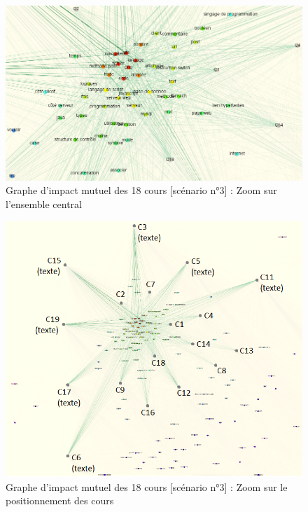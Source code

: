 \begin{figure}[htb!]
\centering
\centerline{  %
\includegraphics[scale=0.65]{4-Experiences/images/cas-3/graphe-Directe-core-zoom.png}
}
\caption{Graphe d'impact mutuel des 18 cours [scénario n°3] : Zoom sur l'ensemble central}
\label{figure:4-cas-3-PII-GrapheCoreZoom}
\end{figure}



\begin{figure}[htb!]
\centering
\centerline{  %
\includegraphics[scale=0.7]{4-Experiences/images/cas-3/graphe-Directe-core-courses-written.png}
}
\caption{Graphe d'impact mutuel des 18 cours [scénario n°3] : Zoom sur le positionnement des cours}
\label{figure:4-cas-3-PII-GrapheCoursesZoom}
\end{figure}


